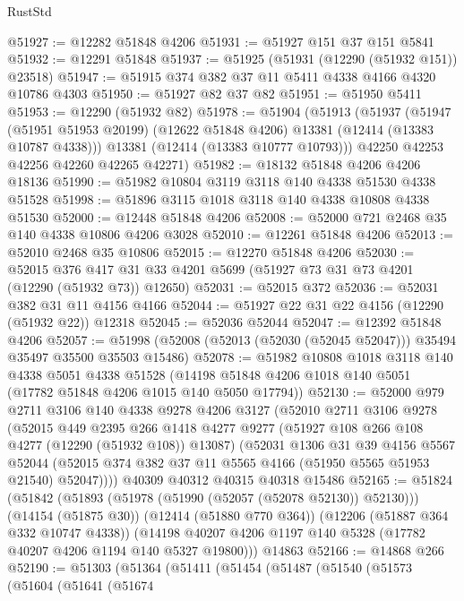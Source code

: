 \begin{lexlean}{RustStd}
\begin{coremodule}
@51927 := @12282 @51848 @4206
@51931 := @51927 @151 @37 @151 @5841
@51932 := @12291 @51848
@51937 := @51925 (@51931 (@12290 (@51932 @151)) @23518)
@51947 := @51915 @374 @382 @37 @11 @5411 @4338 @4166 @4320 @10786 @4303
@51950 := @51927 @82 @37 @82
@51951 := @51950 @5411
@51953 := @12290 (@51932 @82)
@51978 := @51904
    (@51913
      (@51937
        (@51947 (@51951 @51953 @20199) (@12622 @51848 @4206) @13381 (@12414 (@13383 @10787 @4338)))
        @13381
        (@12414 (@13383 @10777 @10793)))
      @42250
      @42253
      @42256
      @42260
      @42265
      @42271)
@51982 := @18132 @51848 @4206 @4206 @18136
@51990 := @51982 @10804 @3119 @3118 @140 @4338 @51530 @4338 @51528
@51998 := @51896 @3115 @1018 @3118 @140 @4338 @10808 @4338 @51530
@52000 := @12448 @51848 @4206
@52008 := @52000 @721 @2468 @35 @140 @4338 @10806 @4206 @3028
@52010 := @12261 @51848 @4206
@52013 := @52010 @2468 @35 @10806
@52015 := @12270 @51848 @4206
@52030 := @52015
    @376
    @417
    @31
    @33
    @4201
    @5699
    (@51927 @73 @31 @73 @4201 (@12290 (@51932 @73)) @12650)
@52031 := @52015 @372
@52036 := @52031 @382 @31 @11 @4156 @4166
@52044 := @51927 @22 @31 @22 @4156 (@12290 (@51932 @22)) @12318
@52045 := @52036 @52044
@52047 := @12392 @51848 @4206
@52057 := @51998 (@52008 (@52013 (@52030 (@52045 @52047))) @35494 @35497 @35500 @35503 @15486)
@52078 := @51982
    @10808
    @1018
    @3118
    @140
    @4338
    @5051
    @4338
    @51528
    (@14198 @51848 @4206 @1018 @140 @5051 (@17782 @51848 @4206 @1015 @140 @5050 @17794))
@52130 := @52000
    @979
    @2711
    @3106
    @140
    @4338
    @9278
    @4206
    @3127
    (@52010
      @2711
      @3106
      @9278
      (@52015
        @449
        @2395
        @266
        @1418
        @4277
        @9277
        (@51927 @108 @266 @108 @4277 (@12290 (@51932 @108)) @13087)
        (@52031
          @1306
          @31
          @39
          @4156
          @5567
          @52044
          (@52015 @374 @382 @37 @11 @5565 @4166 (@51950 @5565 @51953 @21540) @52047))))
    @40309
    @40312
    @40315
    @40318
    @15486
@52165 := @51824
    (@51842
      (@51893 (@51978 (@51990 (@52057 (@52078 @52130)) @52130)))
      (@14154 (@51875 @30))
      (@12414 (@51880 @770 @364))
      (@12206 (@51887 @364 @332 @10747 @4338))
      (@14198 @40207 @4206 @1197 @140 @5328 (@17782 @40207 @4206 @1194 @140 @5327 @19800)))
    @14863
@52166 := @14868 @266
@52190 := @51303
    (@51364
      (@51411
        (@51454
          (@51487
            (@51540
              (@51573
                (@51604
                  (@51641
                    (@51674

\end{coremodule}
\end{lexlean}

